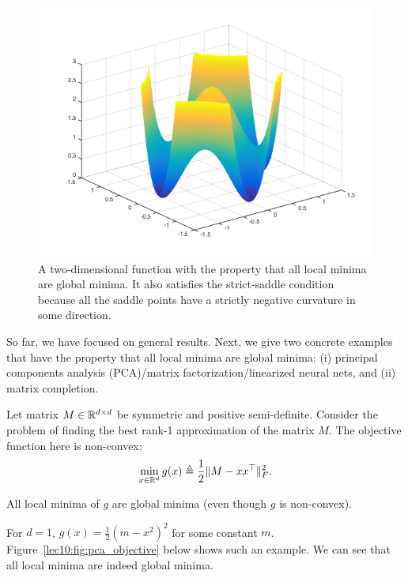 \begin{figure}[ht!]
    \centering
    \includegraphics[scale = 0.5]{figures/localmin.png}
    \caption{A two-dimensional function with the property that all local minima are global minima. It also satisfies the strict-saddle condition because all the saddle points have a strictly negative curvature in some direction.}
    \label{lec10:fig:strict-saddle}
\end{figure}

So far, we have focused on general results. Next, we give two concrete examples that have the property that all local minima are global minima: (i) principal components analysis (PCA)/matrix factorization/linearized neural nets, and (ii) matrix completion.

Let matrix $M \in \mathbb R^{d \times d}$ be symmetric and positive semi-definite. Consider the problem of finding the best rank-1 approximation of the matrix $M$. The objective function here is non-convex:
\begin{equation}
    \min_{x \in \mathbb R^d}g(x) \triangleq \frac{1}{2}\|M - xx^\top \|_F^2.
\end{equation}

\begin{theorem}
All local minima of $g$ are global minima (even though $g$ is non-convex).
\end{theorem}

\begin{remark}
For $d = 1$, $g(x) = \frac{1}{2}(m - x^2)^2$ for some constant $m$. Figure~\ref{lec10:fig:pca_objective} below shows such an example. We can see that all local minima are indeed global minima.
\end{remark}


